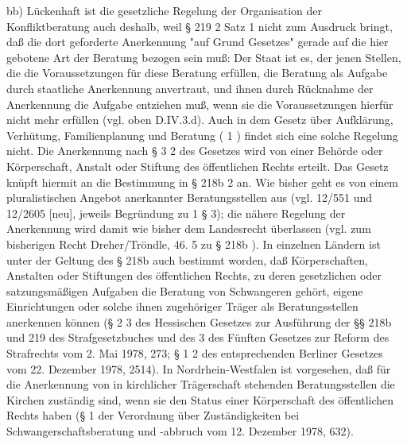 \documentclass[12pt]{article}
\begin{document}
\begin{sourcepara}[title={原文E.172}]
bb) Lückenhaft ist die gesetzliche Regelung der Organisation der Konfliktberatung auch deshalb, weil § 219 \abbrAbs{} 2 Satz 1 \abbrStGB{} \abbrNF{} nicht zum Ausdruck bringt, daß die dort geforderte Anerkennung "auf Grund Gesetzes" gerade auf die hier gebotene Art der Beratung bezogen sein muß: Der Staat ist es, der jenen Stellen, die die Voraussetzungen für diese Beratung erfüllen, die Beratung als Aufgabe durch staatliche Anerkennung anvertraut, und ihnen durch Rücknahme der Anerkennung die Aufgabe entziehen muß, wenn sie die Voraussetzungen hierfür nicht mehr erfüllen (vgl. oben D.IV.3.d). Auch in dem Gesetz über Aufklärung, Verhütung, Familienplanung und Beratung (\abbrArt{} 1 \abbrSFHG{}) findet sich eine solche Regelung nicht. Die Anerkennung nach § 3 \abbrAbs{} 2 des Gesetzes wird von einer Behörde oder Körperschaft, Anstalt oder Stiftung des öffentlichen Rechts erteilt. Das Gesetz knüpft hiermit an die Bestimmung in § 218b \abbrAbs{} 2 \abbrStGB{} \abbrAF{} an. Wie bisher geht es von einem pluralistischen Angebot anerkannter Beratungsstellen aus (vgl. \abbrBTDrucks{} 12/551 und 12/2605 [neu], jeweils Begründung zu \abbrArt{} 1 § 3); die nähere Regelung der Anerkennung wird damit wie bisher dem Landesrecht überlassen (vgl. zum bisherigen Recht Dreher/Tröndle, 46. \abbrAufl{} \abbrRdnr{} 5 zu § 218b \abbrStGB{} \abbrAF{}). In einzelnen Ländern ist unter der Geltung des § 218b \abbrStGB{} \abbrAF{} auch bestimmt worden, daß Körperschaften, Anstalten oder Stiftungen des öffentlichen Rechts, zu deren gesetzlichen oder satzungsmäßigen Aufgaben die Beratung von Schwangeren gehört, eigene Einrichtungen oder solche ihnen zugehöriger Träger als Beratungsstellen anerkennen können (§ 2 \abbrAbs{} 3 des Hessischen Gesetzes zur Ausführung der §§ 218b und 219 des Strafgesetzbuches und des \abbrArt{} 3 des Fünften Gesetzes zur Reform des Strafrechts vom 2. Mai 1978, \abbrGVBl{} \abbrS{} 273; § 1 \abbrAbs{} 2 des entsprechenden Berliner Gesetzes vom 22. Dezember 1978, \abbrGVBl{} \abbrS{} 2514). In Nordrhein-Westfalen ist vorgesehen, daß für die Anerkennung von in kirchlicher Trägerschaft stehenden Beratungsstellen die Kirchen zuständig sind, wenn sie den Status einer Körperschaft des öffentlichen Rechts haben (§ 1 der Verordnung über Zuständigkeiten bei Schwangerschaftsberatung und -abbruch vom 12. Dezember 1978, \abbrGVBl{} \abbrS{} 632).
\end{sourcepara}
\end{document}
